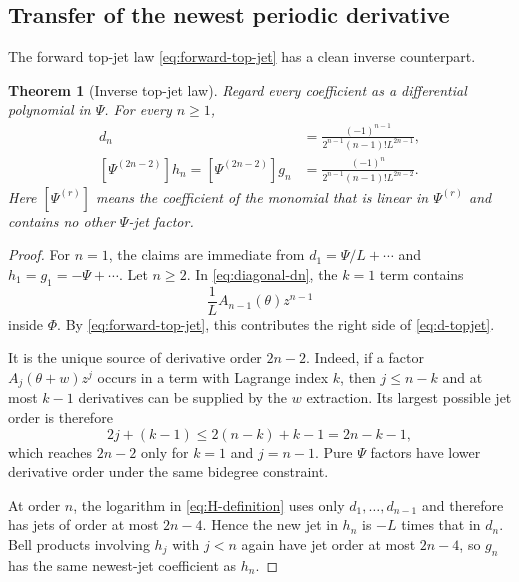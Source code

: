 \documentclass[11pt,oneside]{article}
\numberwithin{equation}{section}
\newtheorem{theorem}{Theorem}[section]
\theoremstyle{definition}
\theoremstyle{remark}
\begin{document}
\subsection{Transfer of the newest periodic derivative}
\label{sec:topjet}

The forward top-jet law \cref{eq:forward-top-jet} has a clean inverse counterpart.

\begin{theorem}[Inverse top-jet law]
\label{thm:inverse-topjet}
Regard every coefficient as a differential polynomial in $\Psi$.  For every $n\ge1$,
\begin{align}
 [\Psi^{(2n-2)}]d_n
 &=\frac{(-1)^{n-1}}
 {2^{n-1}(n-1)!L^{2n-1}},
 \label{eq:d-topjet}\\
 [\Psi^{(2n-2)}]h_n
 =[\Psi^{(2n-2)}]g_n
 &=\frac{(-1)^n}
 {2^{n-1}(n-1)!L^{2n-2}}.
 \label{eq:hg-topjet}
\end{align}
Here $[\Psi^{(r)}]$ means the coefficient of the monomial that is linear in $\Psi^{(r)}$ and contains no other $\Psi$-jet factor.
\end{theorem}

\begin{proof}
For $n=1$, the claims are immediate from
$d_1=\Psi/L+\cdots$ and $h_1=g_1=-\Psi+\cdots$.
Let $n\ge2$.  In \cref{eq:diagonal-dn}, the $k=1$ term contains
\begin{equation}
 \frac1L A_{n-1}(\theta)z^{n-1}
 \label{eq:topjet-source}
\end{equation}
inside $\Phi$.  By \cref{eq:forward-top-jet}, this contributes the right side of \cref{eq:d-topjet}.

It is the unique source of derivative order $2n-2$.  Indeed, if a factor $A_j(\theta+w)z^j$ occurs in a term with Lagrange index $k$, then $j\le n-k$ and at most $k-1$ derivatives can be supplied by the $w$ extraction.  Its largest possible jet order is therefore
\begin{equation}
 2j+(k-1)\le2(n-k)+k-1=2n-k-1,
\end{equation}
which reaches $2n-2$ only for $k=1$ and $j=n-1$.  Pure $\Psi$ factors have lower derivative order under the same bidegree constraint.

At order $n$, the logarithm in \cref{eq:H-definition} uses only
$d_1,\ldots,d_{n-1}$ and therefore has jets of order at most $2n-4$.
Hence the new jet in $h_n$ is $-L$ times that in $d_n$.  Bell products involving $h_j$ with $j<n$ again have jet order at most $2n-4$, so $g_n$ has the same newest-jet coefficient as $h_n$.
\end{proof}
\end{document}
